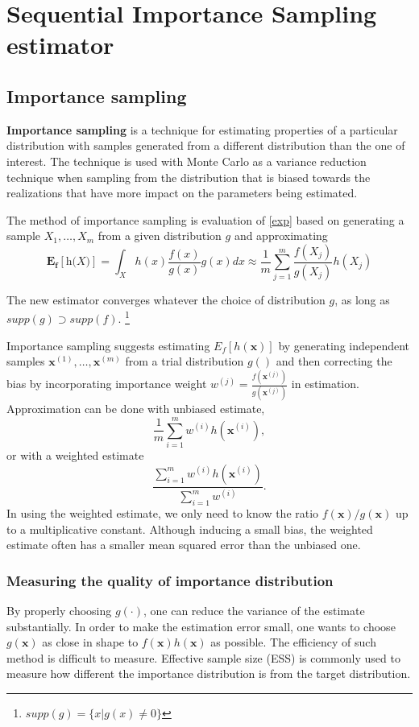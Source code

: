 \documentclass[times, utf8, diplomski]{fer}
\begin{document}
\chapter{Sequential Importance Sampling estimator}
\section{Importance sampling}

\textbf{Importance sampling} is a technique for estimating properties of a particular distribution with samples generated from a different distribution than the one of interest. The technique is used with Monte Carlo as a variance reduction technique when sampling from the distribution that is biased towards the realizations that have more impact on the parameters being estimated.


The method of importance sampling is evaluation of \ref{exp} based on generating a sample $X_1, \ldots, X_m$ from a given distribution $\textit{g}$ and approximating 
\begin{equation*}
\mathbf{E_f[\textit{h(X)}]} = \int_{X} h(x) \frac{f(x)}{g(x)} g(x) dx \approx \frac{1}{m} \sum_{j = 1}^{m} \frac{f(X_j)}{g(X_j)} h(X_j)
\end{equation*}

The new estimator converges whatever the choice of distribution $g$, as long as $supp(g) \supset supp(f)$. \footnote{$supp(g) = \{x | g(x) \neq 0\}$}

Importance sampling suggests estimating $E_f[h(\mathbf{x})]$ by generating independent samples $\mathbf{x}^{(1)}, \ldots, \mathbf{x}^{(m)}$ from a trial distribution $g( )$ and then correcting the bias by incorporating importance weight $w^{(j)} = \frac{f(\mathbf{x}^{(j)})}{g(\mathbf{x}^{(j)})}$ in estimation. Approximation can be done with unbiased estimate,
\begin{equation}
\frac{1}{m}\sum_{i=1}^{m}w^{(i)}h(\mathbf{x}^{(i)}),
\end{equation}
or with a weighted estimate
\begin{equation}
\frac{\sum_{i=1}^{m}w^{(i)}h(\mathbf{x}^{(i)})}{ \sum_{i=1}^{m}w^{(i)}}.
\label{wei_est}
\end{equation}
In using the weighted estimate, we only need to know the ratio $f(\mathbf{x})/g(\mathbf{x})$ up to a multiplicative constant. Although inducing a small bias, the weighted estimate often has a smaller mean squared error than the unbiased one.

\subsection{Measuring the quality of importance distribution}
By properly choosing $g(\cdot)$, one can reduce the variance of the estimate substantially. In order to make the estimation error small, one wants to choose $g(\mathbf{x})$ as close in shape to $f(\mathbf{x})h(\mathbf{x})$ as possible. The efficiency of such method is difficult to measure. Effective sample size (ESS) is commonly used to measure how different the importance distribution is from the target  distribution. 
\end{document}
